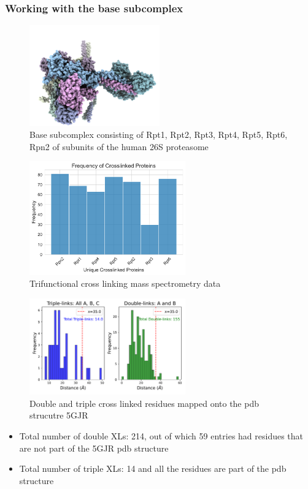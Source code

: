 \documentclass[a4paper,8pt]{beamer}
\begin{document}
%
\begin{frame}
    \frametitle{Working with the base subcomplex}
\begin{figure}
\centering
\includegraphics[width=0.5\textwidth]{figures/base_proteasome_5gjr.png}
\caption{Base subcomplex consisting of Rpt1, Rpt2, Rpt3, Rpt4, Rpt5, Rpt6, Rpn2 of subunits 
of the human 26S proteasome}
  \end{figure}
\end{frame}
%
\begin{frame}
  \begin{figure}
    \centering
    \includegraphics[width=0.6\textwidth]{figures/xl_density.pdf}
    \caption{Trifunctional cross linking mass spectrometry data}
  \end{figure}
\end{frame}
%
\begin{frame}
    \begin{figure}
    \centering
    \includegraphics[width=0.6\textwidth]{figures/xls_satisfaction_base.pdf}
    \caption{Double and triple cross linked residues mapped onto the pdb strucutre 5GJR}
    \end{figure}
    \begin{itemize}
        \item Total number of double XLs: 214, out of which 59 entries had 
        residues that are not part of the 5GJR pdb structure
        \item Total number of triple XLs: 14 and all the residues are part 
        of the pdb structure
    \end{itemize}
\end{frame}
\end{document}
